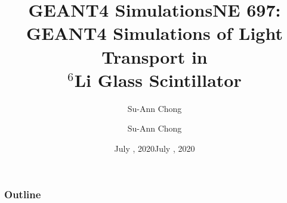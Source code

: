 \documentclass[xcolor=x11names, compress, handout]{beamer}
\title{GEANT4 Simulations}
\author{Su-Ann Chong}
\date{July \nth{31}, 2020}
\renewcommand{\(}{\begin{columns}}
\renewcommand{\)}{\end{columns}}
\newcommand{\<}[1]{\begin{column}{#1}}
\renewcommand{\>}{\end{column}}
\begin{document}
\begin{frame}[plain]
  \title{NE 697: \\\large{GEANT4 Simulations of Light Transport in \\
  $^6$Li Glass Scintillator}}

  \author{Su-Ann Chong}
  \date{July , 2020}
  \titlepage
\end{frame}


\begin{frame}
  \frametitle{Outline}
  \centering
  \begin{minipage}[t][0.5\textheight]{0.75\textwidth}
   \linespread{2.0}
   \tableofcontents
   \vfill
 \end{minipage}
\end{frame}
\end{document}
